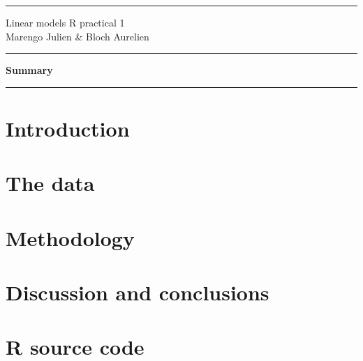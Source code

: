 \documentclass[12pt]{article}
\begin{document}
\thispagestyle{empty}
\hrule
\vspace{1em}
\begin{center}
{\Huge Linear models R practical 1} \\
\vspace{2em}
Marengo Julien \& Bloch Aurelien
\end{center}
\vspace{2em}
\hrule

\vspace{4em}

\begin{center}
{\Large \bf Summary}
\end{center}


\vspace{4em}

\tableofcontents

\vfill

\hrule

\newpage
\setcounter{page}{1}
\section{Introduction}
\section{The data}
\section{Methodology}
\section{Discussion and conclusions}
\newpage
\appendix
\section{R source code}

\newpage



\end{document}
